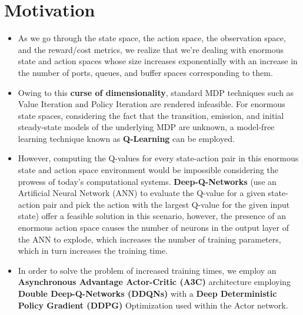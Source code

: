 \documentclass{article}
\begin{document}
\section{Motivation}
\begin{itemize}
    \item As we go through the state space, the action space, the observation space, and the reward/cost metrics, we realize that we're dealing with enormous state and action spaces whose size increases exponentially with an increase in the number of ports, queues, and buffer spaces corresponding to them.
    \item Owing to this \textbf{curse of dimensionality}, standard MDP techniques such as Value Iteration and Policy Iteration are rendered infeasible. For enormous state spaces, considering the fact that the transition, emission, and initial steady-state models of the underlying MDP are unknown, a model-free learning technique known as \textbf{Q-Learning} can be employed.
    \item However, computing the Q-values for every state-action pair in this enormous state and action space environment would be impossible considering the prowess of today's computational systems. \textbf{Deep-Q-Networks} (use an Artificial Neural Network (ANN) to evaluate the Q-value for a given state-action pair and pick the action with the largest Q-value for the given input state) offer a feasible solution in this scenario, however, the presence of an enormous action space causes the number of neurons in the output layer of the ANN to explode, which increases the number of training parameters, which in turn increases the training time.
    \item In order to solve the problem of increased training times, we employ an \textbf{Asynchronous Advantage Actor-Critic (A3C)} architecture employing \textbf{Double Deep-Q-Networks (DDQNs)} with a \textbf{Deep Deterministic Policy Gradient (DDPG)} Optimization used within the Actor network.
\end{itemize}
\end{document}

